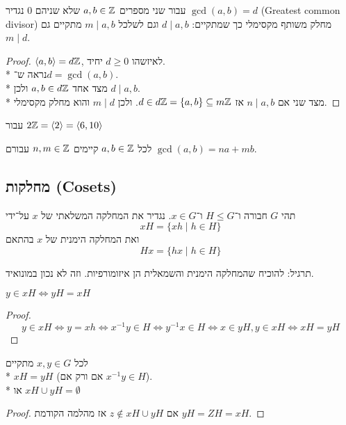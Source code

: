 \begin{definition}[gcb]
	עבור שני מספרים $a, b \in \mathbb{Z}$ שלא שניהם $0$ נגדיר $\gcd(a, b) = d$ (Greatest common divisor) מחלק משותף מקסימלי כך שמתקיים:
	$d \mid a, b$ וגם לשלכל $m \mid a, b$ מתקיים גם $m \mid d$.
\end{definition}
\begin{proof}
	$\langle a, b \rangle = d\mathbb{Z}$, לאיזשהו $d \ge 0$ יחיד. \\*
	נראה ש־$d = \gcd(a, b)$. \\*
	מצד אחד $a, b \in d \mathbb{Z}$ ולכן $d \mid a, b$. \\*
	מצד שני אם $n \mid a, b$ אז $d \in d \mathbb{Z} = \{a, b \} \subseteq m \mathbb{Z}$. ולכן $m \mid d$ והוא מחלק מקסימלי.
\end{proof}
 \begin{example}
	 עבור $2 \mathbb{Z} = \langle 2 \rangle = \langle 6, 10 \rangle$
 \end{example}
 \begin{conclusion}
	 לכל $a, b \in \mathbb{Z}$ קיימים $n, m \in \mathbb{Z}$ עבורם $\gcd(a, b) = na + mb$.
\end{conclusion}

\subsection{מחלקות (Cosets)}
\begin{definition}
	תהי $G$ חבורה ו־$H \le G$ ו־$x \in G$. 
	נגדיר את המחלקה המשלאתי של $x$ על־ידי
	\[
		x H = \{x h \mid h \in H\}
	\]
	ואת המחלקה הימנית של $x$ בהתאם
	\[
		H x = \{h x \mid h \in H\}
	\]
\end{definition}
תרגיל: להוכיח שהמחלקה הימנית והשמאלית הן איזומורפיות. וזה לא נכון במונואיד.

\begin{lemma}
	$y \in xH \iff yH = xH$
\end{lemma}
\begin{proof}
	\[
		y \in xH
		\iff  y = x h
		\iff x^{-1} y \in H
		\iff y^{-1} x \in H
		\iff x \in yH, y \in xH
		\iff xH = yH
	\]
\end{proof}
\begin{conclusion}
	לכל $x, y \in G$ מתקיים \\*
	$x H = y H$ (אם ורק אם $x^{-1} y \in H$). \\*
	או $xH \cup yH = \emptyset$
\end{conclusion}
\begin{proof}
	אם $z \not\in xH \cup yH$ אז מהלמה הקודמת $yH = ZH = xH$.
\end{proof}

